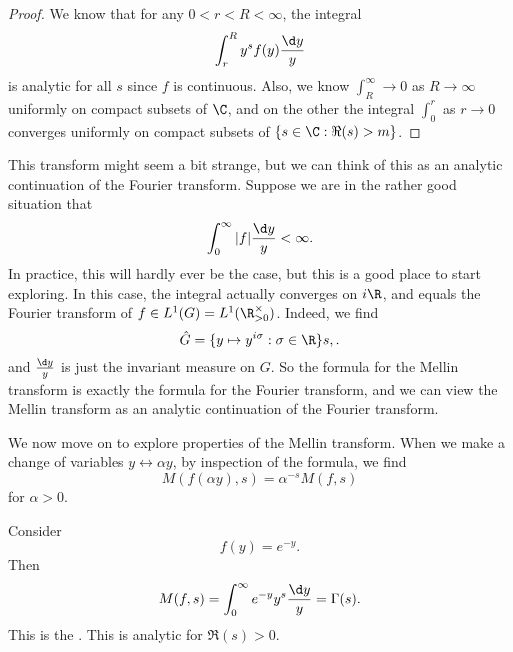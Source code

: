 \documentclass[a4paper]{article}
\begin{document}
\begin{proof}
  We know that for any $0 < r < R < \infty$, the integral
  \[
    \int_r^R y^s f(y) \frac{\d y}{y}
  \]
  is analytic for all $s$ since $f$ is continuous. Also, we know $\int_R^\infty \to 0$ as $R \to \infty$ uniformly on compact subsets of $\C$, and on the other the integral $\int_0^r$ as $r \to 0$ converges uniformly on compact subsets of $\{s \in \C: \Re(s) > m\}$.
\end{proof}

This transform might seem a bit strange, but we can think of this as an analytic continuation of the Fourier transform. Suppose we are in the rather good situation that
\[
  \int_0^\infty |f| \frac{\d y}{y} < \infty.
\]
In practice, this will hardly ever be the case, but this is a good place to start exploring. In this case, the integral actually converges on $i\R$, and equals the Fourier transform of $f \in L^1(G) = L^1(\R^\times_{>0})$. Indeed, we find
\[
  \hat{G} = \{y \mapsto y^{i\sigma} : \sigma \in \R\}s,.
\]
and $\frac{\d y}{y}$ is just the invariant measure on $G$. So the formula for the Mellin transform is exactly the formula for the Fourier transform, and we can view the Mellin transform as an analytic continuation of the Fourier transform.

We now move on to explore properties of the Mellin transform. When we make a change of variables $y \leftrightarrow \alpha y$, by inspection of the formula, we find
\[
  M(f(\alpha y), s) = \alpha^{-s} M(f, s)
\]
for $\alpha > 0$.

\begin{eg}
  Consider
  \[
    f(y) = e^{-y}.
  \]
  Then
  \[
    M(f, s) = \int_0^\infty e^{-y} y^s \frac{\d y}{y} = \Gamma(s).
  \]
  This is the . This is analytic for $\Re(s) > 0$.
\end{eg}
\end{document}
